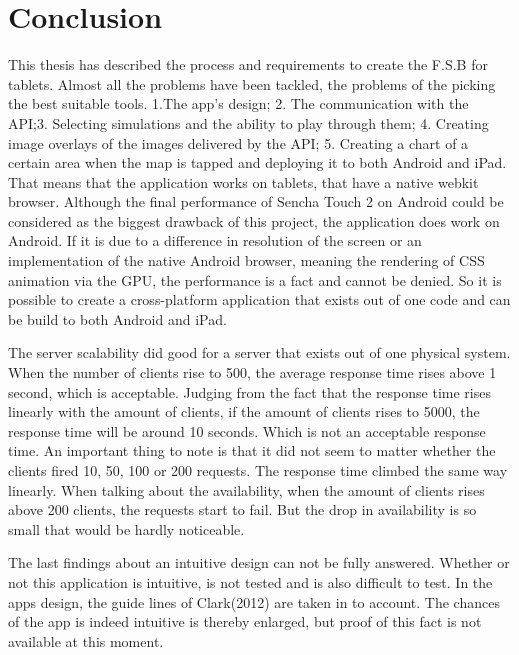 \section{Conclusion}
This thesis has described the process and requirements to create the F.S.B for tablets. Almost all the problems have been tackled, the problems of the picking the best suitable tools. 1.The app's design; 2. The communication with the API;3. Selecting simulations and the ability to play through them; 4. Creating image overlays of the images delivered by the API; 5. Creating a chart of a certain area when the map is tapped and deploying it to both Android and iPad. That means that the application works on tablets, that have a native webkit browser.
Although the final performance of Sencha Touch 2 on Android could be considered as the biggest drawback of this project, the application does work on Android. If it is due to a difference in resolution of the screen or an implementation of the native Android browser, meaning the rendering of CSS animation via the GPU, the performance is a fact and cannot be denied. So it is possible to create a cross-platform application that exists out of one code and can be build to both Android and iPad. 

The server scalability did good for a server that exists out of one physical system. When the number of clients rise to 500, the average response time rises above 1 second, which is acceptable. Judging from the fact that the response time rises linearly with the amount of clients, if the amount of clients rises to 5000, the response time will be around 10 seconds. Which is not an acceptable response time. An important thing to note is that it did not seem to matter whether the clients fired 10, 50, 100 or 200 requests. The response time climbed the same way linearly. 
When talking about the availability, when the amount of clients rises above 200 clients, the requests start to fail. But the drop in availability is so small that would be hardly noticeable.

The last findings about an intuitive design can not be fully answered. Whether or not this application is intuitive, is not tested and is also difficult to test. In the apps design, the guide lines of Clark(2012) are taken in to account. The chances of the app is indeed intuitive is thereby enlarged, but proof of this fact is not available at this moment.

